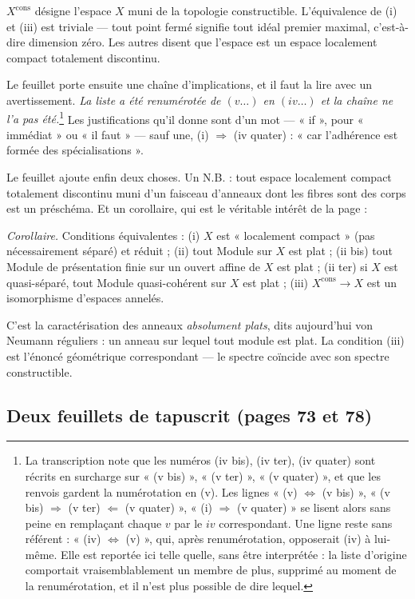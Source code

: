 \documentclass[11pt,a4paper]{article}
\begin{document}
$X^{\mathrm{cons}}$ désigne l'espace $X$ muni de la topologie constructible.
L'équivalence de (i) et (iii) est triviale — tout point fermé signifie tout
idéal premier maximal, c'est-à-dire dimension zéro. Les autres disent que
l'espace est un espace localement compact totalement discontinu.

Le feuillet porte ensuite une chaîne d'implications, et il faut la lire avec un
avertissement. \emph{La liste a été renumérotée de $(v\ldots)$ en $(iv\ldots)$
et la chaîne ne l'a pas été.}\footnote{La transcription note que les numéros
(iv bis), (iv ter), (iv quater) sont récrits en surcharge sur « (v bis) »,
« (v ter) », « (v quater) », et que les renvois gardent la numérotation en (v).
Les lignes « (v) $\Leftrightarrow$ (v bis) », « (v bis) $\Rightarrow$ (v ter)
$\Leftarrow$ (v quater) », « (i) $\Rightarrow$ (v quater) » se lisent alors sans
peine en remplaçant chaque $v$ par le $iv$ correspondant. Une ligne reste sans
référent : « (iv) $\Leftrightarrow$ (v) », qui, après renumérotation, opposerait
(iv) à lui-même. Elle est reportée ici telle quelle, sans être interprétée : la
liste d'origine comportait vraisemblablement un membre de plus, supprimé au
moment de la renumérotation, et il n'est plus possible de dire lequel.} Les
justifications qu'il donne sont d'un mot — « if », pour « immédiat » ou « il
faut » — sauf une, (i) $\Rightarrow$ (iv quater) : « car l'adhérence est formée
des spécialisations ».

Le feuillet ajoute enfin deux choses. Un N.B. : tout espace localement compact
totalement discontinu muni d'un faisceau d'anneaux dont les fibres sont des
corps est un préschéma. Et un corollaire, qui est le véritable intérêt de la
page :

\emph{Corollaire.} Conditions équivalentes : (i) $X$ est « localement compact »
(pas nécessairement séparé) et réduit ; (ii) tout Module sur $X$ est plat ;
(ii bis) tout Module de présentation finie sur un ouvert affine de $X$ est
plat ; (ii ter) si $X$ est quasi-séparé, tout Module quasi-cohérent sur $X$ est
plat ; (iii) $X^{\mathrm{cons}} \to X$ est un isomorphisme d'espaces annelés.

C'est la caractérisation des anneaux \emph{absolument plats}, dits aujourd'hui
von Neumann réguliers : un anneau sur lequel tout module est plat. La condition
(iii) est l'énoncé géométrique correspondant — le spectre coïncide avec son
spectre constructible.

\subsection*{Deux feuillets de tapuscrit (pages 73 et 78)}
\end{document}

